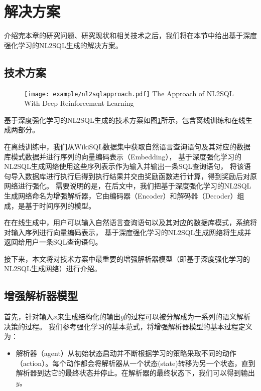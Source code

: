 \section{解决方案}

介绍完本章的研究问题、研究现状和相关技术之后，我们将在本节中给出基于深度强化学习的NL2SQL生成的解决方案。

\subsection{技术方案}
\begin{figure}[!htp]
  \centering
  \texttt{[image: example/nl2sqlapproach.pdf]}
    {The Approach of NL2SQL With Deep Reinforcement Learning}
  \label{fig:nl2sqlapproach}
\end{figure}

基于深度强化学习的NL2SQL生成的技术方案如图\ref{fig:nl2sqlapproach}所示，包含离线训练和在线生成两部分。

在离线训练中，我们从WikiSQL数据集中获取自然语言查询语句及其对应的数据库模式数据并进行序列的向量编码表示（Embedding），
基于深度强化学习的NL2SQL生成网络使用这些序列表示作为输入并输出一条SQL查询语句，
将该语句导入数据库进行执行后得到执行结果并交由奖励函数进行计算，得到奖励后对原网络进行强化。
需要说明的是，在后文中，我们把基于深度强化学习的NL2SQL生成网络命名为增强解析器，它由编码器（Encoder）和解码器（Decoder）组成，是基于时间序列的模型。

在在线生成中，用户可以输入自然语言查询语句以及其对应的数据库模式，系统将对输入序列进行向量编码表示，
基于深度强化学习的NL2SQL生成网络将生成并返回给用户一条SQL查询语句。

接下来，本文将对技术方案中最重要的增强解析器模型（即基于深度强化学习的NL2SQL生成网络）进行介绍。

\subsection{增强解析器模型}
\label{enl2sql:zqjxqmx}
首先，针对输入$x$来生成结构化的输出$y$的过程可以被分解成为一系列的语义解析决策的过程。
我们参考强化学习的基本范式，将增强解析器模型的基本过程定义为：

\begin{itemize}
  \item 解析器（agent）从初始状态启动并不断根据学习的策略采取不同的动作（action）。每个动作都会将解析器从一个状态(state)转移为另一个状态，直到解析器到达它的最终状态并停止。在解析器的最终状态下，我们可以得到输出$y$。
\end{itemize}

